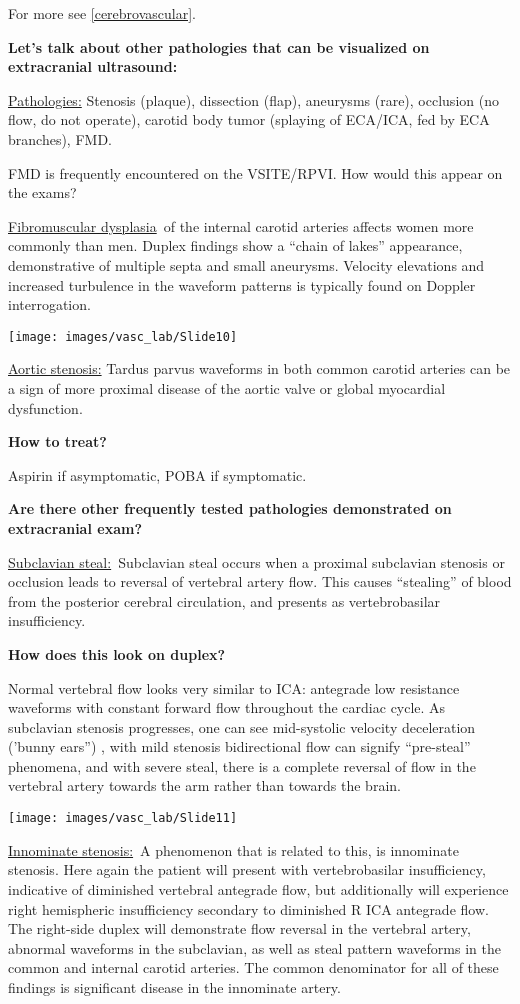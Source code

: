 \documentclass[
]{book}
\begin{document}
For more see \ref{cerebrovascular}.

\textbf{Let's talk about other pathologies that can be visualized on
extracranial ultrasound:}

\uline{Pathologies:} Stenosis (plaque), dissection (flap),
aneurysms (rare), occlusion (no flow, do not operate), carotid body
tumor (splaying of ECA/ICA, fed by ECA branches), FMD.

FMD is frequently encountered on the VSITE/RPVI. How would this appear
on the exams?

\uline{Fibromuscular dysplasia}~of the internal carotid arteries
affects women more commonly than men. Duplex findings show a ``chain of
lakes'' appearance, demonstrative of multiple septa and small aneurysms.
Velocity elevations and increased turbulence in the waveform patterns is
typically found on Doppler interrogation.\citep{olin2012}

\texttt{[image: images/vasc\_lab/Slide10]}

\uline{Aortic stenosis:} Tardus parvus waveforms in both common
carotid arteries can be a sign of more proximal disease of the aortic
valve or global myocardial dysfunction.

\textbf{How to treat?}

Aspirin if asymptomatic, POBA if symptomatic.

\textbf{Are there other frequently tested pathologies demonstrated on
extracranial exam?}

\uline{Subclavian steal:}~Subclavian steal occurs when a proximal
subclavian stenosis or occlusion leads to reversal of vertebral artery
flow. This causes ``stealing'' of blood from the posterior cerebral
circulation, and presents as vertebrobasilar insufficiency.

\textbf{How does this look on duplex?}

Normal vertebral flow looks very similar to ICA: antegrade low
resistance waveforms with constant forward flow throughout the cardiac
cycle. As subclavian stenosis progresses, one can see mid-systolic
velocity deceleration ('bunny ears'') , with mild stenosis bidirectional
flow can signify ``pre-steal'' phenomena, and with severe steal, there is
a complete reversal of flow in the vertebral artery towards the arm
rather than towards the brain.\citep{kalaria2005, mousa2017}

\texttt{[image: images/vasc\_lab/Slide11]}

\uline{Innominate stenosis:}~A phenomenon that is related to this,
is innominate stenosis. Here again the patient will present with
vertebrobasilar insufficiency, indicative of diminished vertebral
antegrade flow, but additionally will experience right hemispheric
insufficiency secondary to diminished R ICA antegrade flow. The
right-side duplex will demonstrate flow reversal in the vertebral
artery, abnormal waveforms in the subclavian, as well as steal pattern
waveforms in the common and internal carotid arteries. The common
denominator for all of these findings is significant disease in the
innominate artery.
\end{document}
